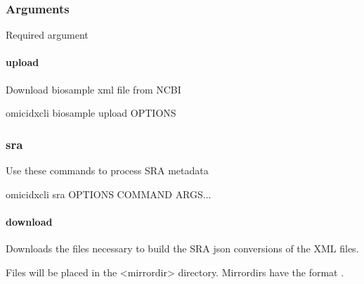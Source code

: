 \documentclass[letterpaper,10pt,english]{sphinxmanual}
\begin{document}
\subsubsection*{Arguments}

\begin{fulllineitems}
\label{\detokenize{cli:cmdoption-omicidx-cli-biosample-parse-arg-biosample-file}}
Required argument

\end{fulllineitems}



\paragraph{upload}
\label{\detokenize{cli:omicidx-cli-biosample-upload}}
Download biosample xml file from NCBI

\begin{sphinxVerbatim}[commandchars=\\\{\}]
omicidx\PYGZhy{}cli biosample upload \PYG{o}{[}OPTIONS\PYG{o}{]}
\end{sphinxVerbatim}


\subsubsection{sra}
\label{\detokenize{cli:omicidx-cli-sra}}
Use these commands to process SRA metadata

\begin{sphinxVerbatim}[commandchars=\\\{\}]
omicidx\PYGZhy{}cli sra \PYG{o}{[}OPTIONS\PYG{o}{]} COMMAND \PYG{o}{[}ARGS\PYG{o}{]}...
\end{sphinxVerbatim}


\paragraph{download}
\label{\detokenize{cli:omicidx-cli-sra-download}}
Downloads the files necessary to build
the SRA json conversions of the XML files.

Files will be placed in the \textless{}mirrordir\textgreater{} directory. Mirrordirs
have the format .
\end{document}

